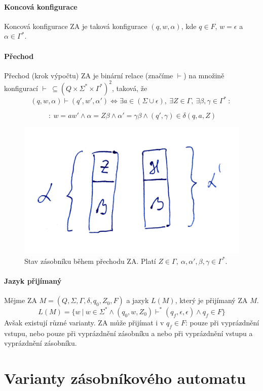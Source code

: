 \paragraph{Koncová konfigurace} Koncová konfigurace ZA je taková konfigurace $(q, w, \alpha)$, kde $q \in F$, $w = \epsilon$ a $\alpha \in \Gamma^*$.

\paragraph{Přechod} Přechod (krok výpočtu) ZA je binární relace (značíme $\vdash$) na množině konfigurací $\vdash ~ \subseteq (Q \times \Sigma^* \times \Gamma^*)^2$, taková, že $$ (q, w, \alpha) \vdash (q', w', \alpha') \Leftrightarrow \exists a \in (\Sigma \cup \epsilon), ~ \exists Z \in \Gamma, ~ \exists \beta, \gamma \in \Gamma^* ~:~ $$

$$ ~:~ w = aw' \land \alpha = Z \beta \land \alpha' = \gamma \beta \land (q', \gamma) \in \delta(q, a, Z) $$

\begin{figure}[H]
    \centering
    \includegraphics[width=0.35\linewidth]{za_prechod_zasobnik.pdf}
    \caption{Stav zásobníku během přechodu ZA. Platí $Z \in \Gamma,~ \alpha, \alpha', \beta, \gamma \in \Gamma^*$.}
\end{figure}

\paragraph{Jazyk přijímaný} Mějme ZA $M = (Q, \Sigma, \Gamma, \delta, q_0, Z_0, F)$ a jazyk $L(M)$, který je přijímaný ZA $M$. $$ L(M) = \{ w ~|~ w \in \Sigma^* \land (q_0, w, Z_0) \vdash^* (q_f, \epsilon, \epsilon) \land q_f \in F \}$$ Avšak existují různé varianty. ZA může přijímat i v $q_f \in F$: pouze při vyprázdnění vstupu, nebo pouze při vyprázdnění zásobníku a nebo při vyprázdnění vstupu a vyprázdnění zásobníku.


\section{Varianty zásobníkového automatu}

